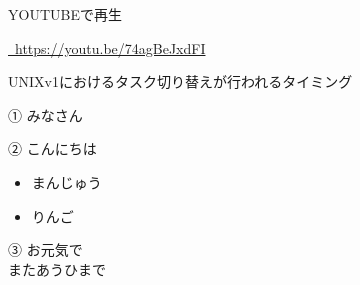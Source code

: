 \href{https://youtu.be/74agBeJxdFI}{\textcolor{red}{\faYoutube}} YOUTUBEで再生

\textcolor{red}{\faYoutube}\href{https://youtu.be/74agBeJxdFI}{~\url{https://youtu.be/74agBeJxdFI}}




UNIXv1におけるタスク切り替えが行われるタイミング

\colorbox{mygray}{\begin{minipage}{\textwidth}
① みなさん
\end{minipage}}

\colorbox{mygray}{\begin{minipage}{\textwidth}
② こんにちは 
\begin{itemize}
\item まんじゅう
\item りんご
\end{itemize}
\end{minipage}}

\colorbox{mypink1}{\begin{minipage}{\textwidth}
③ お元気で\\
またあうひまで
\end{minipage}}

